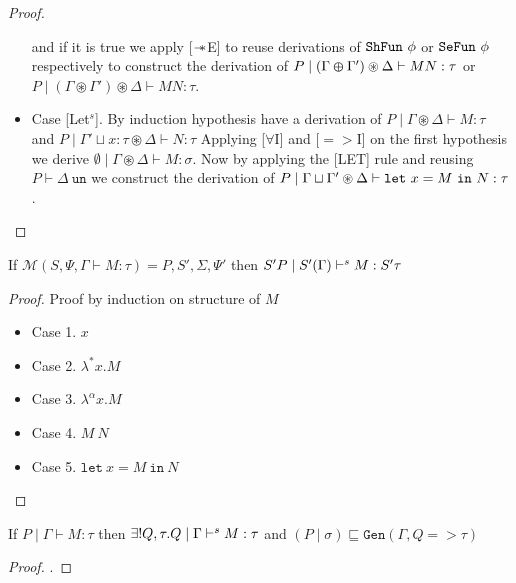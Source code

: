 \begin{proof}
\begin{itemize}
    and if it is true we apply [$\mathrel{-\mkern-6mu*}$E] to reuse derivations of $\texttt{ShFun}\ \phi$ or $\texttt{SeFun}\ \phi$ respectively to construct the derivation
    of $P \mid (\Gamma \varoplus \Gamma') \circledast \Delta \vdash M N:\tau$ or $P \mid (\Gamma \circledast \Gamma') \circledast \Delta \vdash M N:\tau$.
  \item{Case [Let$^s$].}
    By induction hypothesis have a derivation of $P \mid \Gamma \circledast \Delta \vdash M: \tau$ and $P \mid \Gamma' \sqcup x:\tau \circledast \Delta \vdash N:\tau$
    Applying [$\forall$I] and [$=>$I] on the first hypothesis we derive $\emptyset \mid \Gamma \circledast \Delta \vdash M: \sigma$. Now by applying
    the [LET] rule and reusing $P \vdash \Delta\ \texttt{un}$ we construct the derivation of
    $P \mid \Gamma \sqcup \Gamma' \circledast \Delta \vdash \texttt{let}\ x = M\ \texttt{in}\ N:\tau$.
  \end{itemize}
\end{proof}

\begin{theorem}
   If $\mathcal{M}(S, \Psi, \Gamma \vdash M : \tau) = P, S', \Sigma, \Psi'$ then $S' P \mid S' (\Gamma) \vdash^s M : S' \tau$
\end{theorem}
\begin{proof}
  Proof by induction on structure of $M$
  \begin{itemize}
  \item Case 1. $x$
  \item Case 2. $\lambda^{*} x. M$
  \item Case 3. $\lambda ^{\alpha}x. M$
  \item Case 4. $M\ N$
  \item Case 5. $\texttt{let}\ x = M\ \texttt{in}\ N$
  \end{itemize}
\end{proof}


\begin{theorem}\label{thm:completeness-syntax-directed}
  If $P \mid \Gamma \vdash M:\tau$ then
  $\exists ! Q,\tau. Q \mid \Gamma \vdash^s M:\tau$
  and $(P \mid \sigma) \sqsubseteq \texttt{Gen}(\Gamma, Q => \tau)$
\end{theorem}
\begin{proof}
  .
\end{proof}

